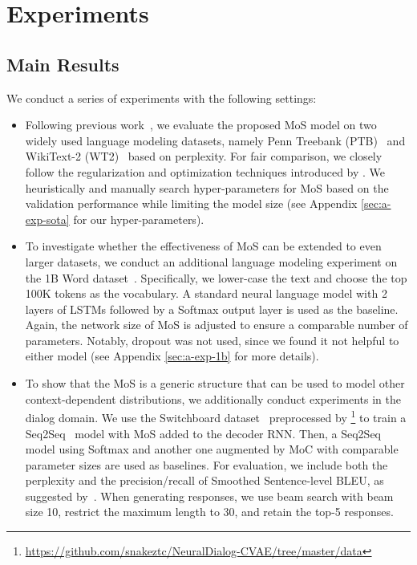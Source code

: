 
\section{Experiments}\label{sec:exp}
\subsection{Main Results}
\label{sec:exp-main}

We conduct a series of experiments with the following settings:
\begin{itemize}[leftmargin=1.5em,label=$\bullet$]
\item Following previous work~\citep{krause2017dynamic,merity2017regularizing,melis2017state}, we evaluate the proposed MoS model on two widely used language modeling datasets, namely Penn Treebank (PTB)~\citep{mikolov2010recurrent} and WikiText-2 (WT2)~\citep{merity2016pointer} based on perplexity.
For fair comparison, we closely follow the regularization and optimization techniques introduced by \citet{merity2017regularizing}. We heuristically and manually search hyper-parameters for MoS based on the validation performance while limiting the model size (see Appendix \ref{sec:a-exp-sota} for our hyper-parameters).
\item To investigate whether the effectiveness of MoS can be extended to even larger datasets, we conduct an additional language modeling experiment on the 1B Word dataset~\citep{chelba2013one}.
Specifically, 
we lower-case the text and choose the top 100K tokens as the vocabulary.
A standard neural language model with 2 layers of LSTMs followed by a Softmax output layer is used as the baseline.
Again, the network size of MoS is adjusted to ensure a comparable number of parameters.
Notably, dropout was not used, since we found it not helpful to either model (see Appendix \ref{sec:a-exp-1b} for more details).
\item To show that the MoS is a generic structure that can be used to model other context-dependent distributions, we additionally conduct experiments in the dialog domain. We use the Switchboard dataset~\citep{godfrey1997switchboard} preprocessed by \citet{zhao2017learning}\footnote{\url{https://github.com/snakeztc/NeuralDialog-CVAE/tree/master/data}} to train a Seq2Seq~\citep{sutskever2014sequence} model with MoS added to the decoder RNN. Then, a Seq2Seq model using Softmax and another one augmented by MoC with comparable parameter sizes are used as baselines. For evaluation, we include both the perplexity and the precision/recall of Smoothed Sentence-level BLEU, as suggested by~\citet{zhao2017learning}. When generating responses, we use beam search with beam size 10, restrict the maximum length to 30, and retain the top-5 responses.
\end{itemize}

